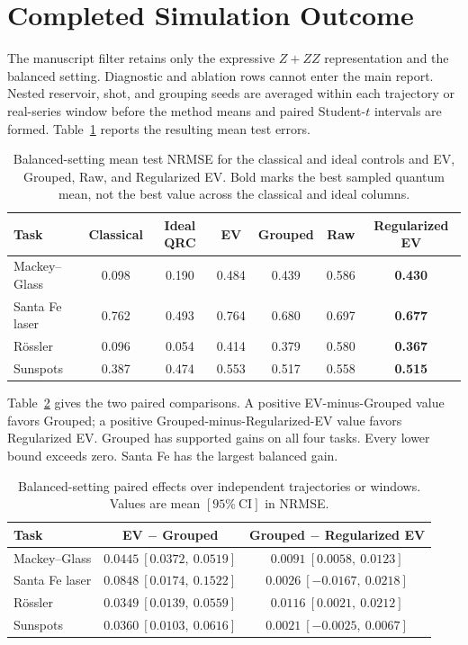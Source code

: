 \documentclass[10pt,conference]{IEEEtran}
\begin{document}
\section{Completed Simulation Outcome}
\label{app:outcome}

The manuscript filter retains only the expressive $Z+ZZ$ representation and
the balanced setting. Diagnostic and ablation rows cannot enter the main
report. Nested reservoir, shot, and grouping
seeds are averaged within each trajectory or real-series window before
the method means and paired Student-$t$ intervals are formed.
Table~\ref{tab:supp-main-means} reports the resulting mean test errors.

\begin{table}[t]
\caption{Balanced-setting mean test NRMSE for the classical and ideal controls
and EV, Grouped, Raw, and Regularized EV. Bold marks the best sampled quantum mean,
not the best value across the classical and ideal columns.}
\label{tab:supp-main-means}
\centering
\begin{tabular}{lcccccc}
\toprule
Task & Classical & Ideal QRC & EV & Grouped & Raw & Regularized EV \\
\midrule
Mackey--Glass & 0.098 & 0.190 & 0.484 & 0.439 & 0.586 & \textbf{0.430} \\
Santa Fe laser & 0.762 & 0.493 & 0.764 & 0.680 & 0.697 & \textbf{0.677} \\
R\"ossler & 0.096 & 0.054 & 0.414 & 0.379 & 0.580 & \textbf{0.367} \\
Sunspots & 0.387 & 0.474 & 0.553 & 0.517 & 0.558 & \textbf{0.515} \\
\bottomrule
\end{tabular}
\end{table}

Table~\ref{tab:supp-contrasts} gives the two paired comparisons. A
positive EV-minus-Grouped value favors Grouped; a positive
Grouped-minus-Regularized-EV value favors Regularized EV. Grouped has supported gains on all
four tasks. Every lower bound exceeds zero. Santa Fe has the largest balanced
gain.

\begin{table}[t]
\caption{Balanced-setting paired effects over independent trajectories or
windows. Values are mean $[95\%\ \mathrm{CI}]$ in NRMSE.}
\label{tab:supp-contrasts}
\centering
\begin{tabular}{lcc}
\toprule
Task & EV $-$ Grouped & Grouped $-$ Regularized EV \\
\midrule
Mackey--Glass & $0.0445\ [0.0372,\ 0.0519]$ & $0.0091\ [0.0058,\ 0.0123]$ \\
Santa Fe laser & $0.0848\ [0.0174,\ 0.1522]$ & $0.0026\ [-0.0167,\ 0.0218]$ \\
R\"ossler & $0.0349\ [0.0139,\ 0.0559]$ & $0.0116\ [0.0021,\ 0.0212]$ \\
Sunspots & $0.0360\ [0.0103,\ 0.0616]$ & $0.0021\ [-0.0025,\ 0.0067]$ \\
\bottomrule
\end{tabular}
\end{table}
\end{document}
